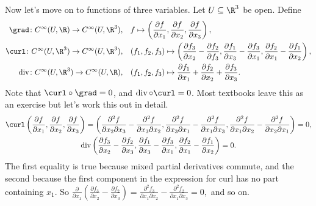 Now let's move on to functions of three variables. Let $U \subseteq \R^3$ be open. Define 
\begin{align*}
    \grad  \colon C ^{\infty}(U,\R) \to C^{\infty}(U, \R^3),\quad &f \mapsto \left( \frac{\partial f}{\partial x_1},\frac{\partial f}{\partial x_2},\frac{\partial f}{\partial x_3} \right), \\
    \curl \colon  C^{\infty}(U,\R^3)\to C^{\infty}(U,\R^3),\quad &(f_1,f_2,f_3) \mapsto \left( \frac{\partial f_3}{\partial x_2}-\frac{\partial f_2}{\partial f_3},\frac{\partial f_1}{\partial x_3}-\frac{\partial f_3}{\partial x_1},\frac{\partial f_2}{\partial x_1}-\frac{\partial f_1}{\partial x_2}\right), \\
\operatorname{div} \colon C^{\infty}(U,\R^3) \to C^{\infty}(U,\R),\quad &(f_1,f_2,f_3) \mapsto \frac{\partial f_1}{\partial x_1}+\frac{\partial f_2}{\partial x_2}+\frac{\partial f_3}{\partial x_3}.
\end{align*}
Note that $\curl \circ \grad=0$, and $\operatorname{div}\circ \curl=0$. Most textbooks leave this as an exercise but let's work this out in detail. 
\begin{gather*}
    \curl\left( \frac{\partial f}{\partial x_1},\frac{\partial f}{\partial x_2},\frac{\partial f}{\partial x_3} \right) =\left( \frac{\partial ^2f}{\partial x_2\partial x_3}-\frac{\partial ^2f}{\partial x_3\partial x_2},\frac{\partial ^2f}{\partial x_3\partial x_1}-\frac{\partial ^2f}{\partial x_1\partial x_3},\frac{\partial ^2f}{\partial x_1\partial x_2} -\frac{\partial ^2f}{\partial x_2\partial x_1}\right) =0,\\
    \operatorname{div}\left( \frac{\partial f_3}{\partial x_2}-\frac{\partial f_2}{\partial x_3},\frac{\partial f_1}{\partial x_3}-\frac{\partial f_3}{\partial x_1},\frac{\partial f_2}{\partial x_1}-\frac{\partial f_1}{\partial x_2}\right)=0.
\end{gather*}The first equality is true because mixed partial derivatives commute, and the second because the first component in the expression for curl has no part containing $x_1$. So $\frac{\partial }{\partial x_1}\left( \frac{\partial f_3}{\partial x_2}-\frac{\partial f_2}{\partial x_3} \right) =\frac{\partial ^2 f_3}{\partial x_1\partial x_2}-\frac{\partial ^2f_2}{\partial x_1\partial x_3}=0,$ and so on.

